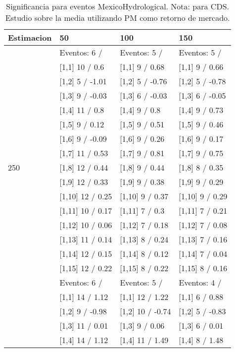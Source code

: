 \begin{table}

\caption{Significancia para eventos MexicoHydrological. Nota: para CDS. Estudio sobre la media utilizando PM como retorno de mercado.}
\centering
\begin{tabular}[t]{llll}
\toprule
Estimacion & 50 & 100 & 150\\
\midrule
 & Eventos:  6 / & Eventos:  5 / & Eventos:  5 /\\
 & {}[1,1] 10  / 0.6 & {}[1,1] 9  / 0.68 & {}[1,1] 9  / 0.66\\
 & {}[1,2] 5  / -1.01 & {}[1,2] 5  / -0.76 & {}[1,2] 5  / -0.78\\
 & {}[1,3] 9  / -0.03 & {}[1,3] 6  / -0.03 & {}[1,3] 6  / -0.05\\
 & {}[1,4] 11  / 0.8 & {}[1,4] 9  / 0.8 & {}[1,4] 9  / 0.73\\
\addlinespace
 & {}[1,5] 9  / 0.12 & {}[1,5] 9  / 0.51 & {}[1,5] 9  / 0.46\\
 & {}[1,6] 9  / -0.09 & {}[1,6] 9  / 0.26 & {}[1,6] 9  / 0.17\\
 & {}[1,7] 11  / 0.53 & {}[1,7] 9  / 0.81 & {}[1,7] 9  / 0.75\\
250 & {}[1,8] 12  / 0.44 & {}[1,8] 9  / 0.44 & {}[1,8] 8  / 0.35\\
 & {}[1,9] 12  / 0.33 & {}[1,9] 9  / 0.38 & {}[1,9] 9  / 0.29\\
\addlinespace
 & {}[1,10] 12  / 0.25 & {}[1,10] 9  / 0.37 & {}[1,10] 9  / 0.29\\
 & {}[1,11] 10  / 0.17 & {}[1,11] 7  / 0.3 & {}[1,11] 7  / 0.21\\
 & {}[1,12] 10  / 0.06 & {}[1,12] 7  / 0.18 & {}[1,12] 7  / 0.08\\
 & {}[1,13] 11  / 0.14 & {}[1,13] 8  / 0.24 & {}[1,13] 7  / 0.16\\
 & {}[1,14] 12  / 0.15 & {}[1,14] 8  / 0.12 & {}[1,14] 7  / 0.04\\
\addlinespace
 & {}[1,15] 12  / 0.22 & {}[1,15] 8  / 0.22 & {}[1,15] 8  / 0.16\\
 & Eventos:  6 / & Eventos:  5 / & Eventos:  4 /\\
 & {}[1,1] 14  / 1.12 & {}[1,1] 12  / 1.22 & {}[1,1] 6  / 0.88\\
 & {}[1,2] 9  / -0.98 & {}[1,2] 10  / -0.74 & {}[1,2] 5  / -0.83\\
 & {}[1,3] 11  / 0.01 & {}[1,3] 9  / 0.06 & {}[1,3] 6  / 0.01\\
\addlinespace
 & {}[1,4] 14  / 1.12 & {}[1,4] 11  / 1.49 & {}[1,4] 8  / 1.48\\

\end{tabular}
\end{table}
